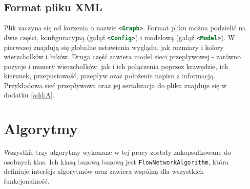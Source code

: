 \subsection{Format pliku XML}
Plik zaczyna się od korzenia o nazwie \lstinline[language=XML]|<Graph>|. Format pliku można podzielić na dwie części, konfiguracyjną (gałąź \lstinline[language=XML]|<Config>|) i modelową (gałąź \lstinline[language=XML]|<Model>|). W pierwszej znajdują się globalne ustawienia wyglądu, jak rozmiary i kolory wierzchołków i łuków. Druga część zawiera model sieci przepływowej - zarówno pozycje i numery wierzchołków, jak i ich połączenia poprzez krawędzie, ich kierunek, przepustowość, przepływ oraz położenie napisu z informacją. Przykładowa sieć przepływowa oraz jej serializacja do pliku znajduje się w dodatku \ref{add:A}.


\section{Algorytmy}
Wszystkie trzy algorytmy wykonane w tej pracy zostały zakapsułkowane do osobnych klas. Ich klasą bazową bazową jest \lstinline|FlowNetworkAlgorithm|, która definiuje interfejs algorytmów oraz zawiera wspólną dla wszystkich funkcjonalność.
